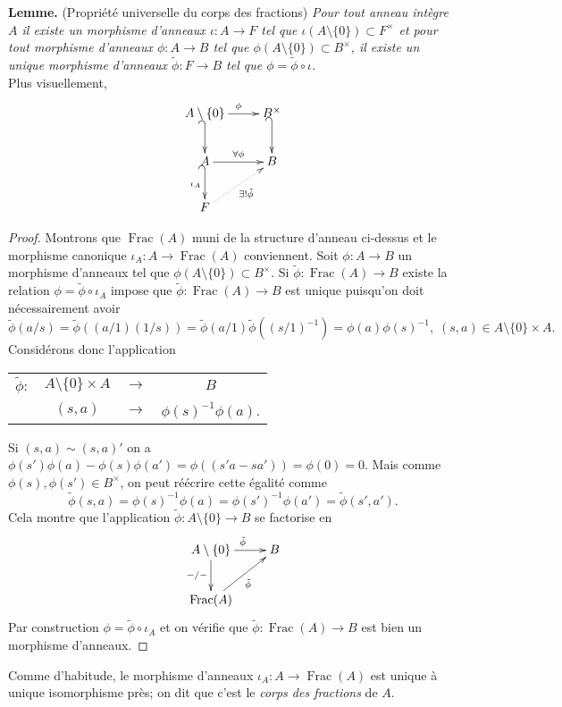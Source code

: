 \documentclass[a4paper, oneside, 12pt]{book}
\theoremstyle{theoremeStyle} %
\theoremstyle{definition} %
\DeclareMathOperator{\Frac}{Frac}
\begin{document}
 \textbf{Lemme.} (Propriété universelle du corps des fractions) \textit{Pour tout anneau intègre $A$  il existe un morphisme d'anneaux $\iota :A\rightarrow F$ tel que $\iota(A\setminus \lbrace 0\rbrace)\subset F^\times$ et pour tout  morphisme d'anneaux $\phi:A\rightarrow B$ tel que $\phi(A\setminus \lbrace 0\rbrace)\subset B^\times $, il  existe un unique morphisme d'anneaux $ \tilde{\phi}:F\rightarrow B$ tel que $\phi=  \tilde{\phi}\circ \iota $.}\\

  Plus visuellement,
 $$\xymatrix{A\setminus \lbrace 0\rbrace\ar[r]^\phi\ar@{_{(}->}[d]&B^\times\ar@{_{(}->}[d]\\
 A\ar[r]^{\forall\phi}\ar@{_{(}->}[d]_{\iota_A}&B\\
 F\ar@{.>}[ur]_{\exists !\tilde{\phi}}}$$

 \begin{proof} Montrons que  $\Frac(A)$ muni de la structure d'anneau ci-dessus et le morphisme canonique $\iota_A:A\rightarrow \Frac(A)$ conviennent. Soit $\phi:A\rightarrow B$  un morphisme d'anneaux tel que $\phi(A\setminus \lbrace 0\rbrace)\subset B^\times $.  Si $\tilde{\phi}:\Frac(A)\rightarrow B$ existe la relation $\phi=\tilde{\phi}\circ \iota_A$ impose que  $\tilde{\phi}:\Frac(A)\rightarrow B$ est unique puisqu'on doit nécessairement avoir
 $$\tilde{\phi}(a/s)=\tilde{\phi}((a/1)(1/s))=\tilde{\phi}(a/1) \tilde{\phi}((s/1)^{-1})=\phi(a)\phi(s)^{-1},\; (s,a)\in A\setminus\lbrace 0\rbrace\times A.$$
 Considérons donc l'application  \begin{tabular}[t]{lclc}
 $\tilde{\phi}:$&$ A\setminus\lbrace 0\rbrace\times A $&$\rightarrow$&$B$\\
 &$(s,a) $&$\rightarrow$&$ \phi(s)^{-1}\phi(a)$.
 \end{tabular}
 Si $(s,a)\sim (s,a)'$  on a $ \phi(s')\phi(a)-\phi(s)\phi(a') =\phi( (s'a-sa'))=\phi(0)=0$. Mais comme $\phi(s),\phi(s') \in B^{\times}$, on peut réécrire cette égalité comme
 $$\tilde{\phi}(s,a)=\phi(s)^{-1}\phi(a)=\phi(s')^{-1}\phi(a')=\tilde{\phi}( s',a').$$
 Cela montre que l'application $\tilde{\phi}:  A\setminus\lbrace 0\rbrace  \rightarrow  B$ se factorise  en
 $$\xymatrix{ A\setminus\lbrace 0\rbrace\ar[r]^{\tilde{\phi}}\ar[d]_{-/-}& B\\
\Frac(A) \ar[ur]_{\tilde{\phi}}&} $$
Par construction $\phi=  \tilde{\phi}\circ \iota_A$ et on vérifie que $\tilde{\phi}: \Frac(A)\rightarrow B$ est bien un morphisme d'anneaux.
  \end{proof}

  Comme d'habitude, le morphisme d'anneaux  $\iota_A:  A\rightarrow \Frac(A)$ est unique à unique isomorphisme près; on dit que c'est le   \textit{corps des fractions} de $A$.\\
\end{document}
